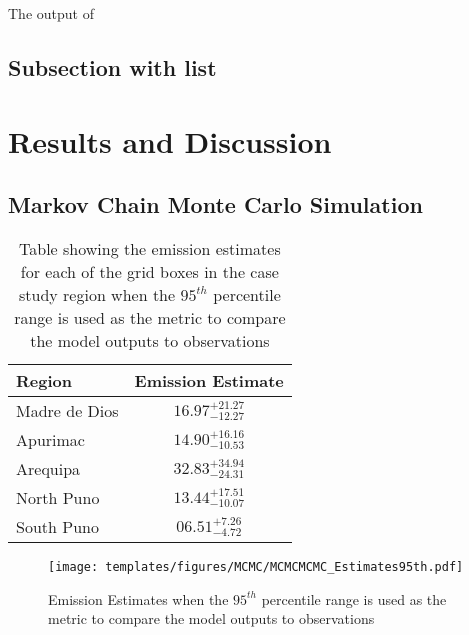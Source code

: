 \begin{flushleft}
The output of 
\end{flushleft}


\subsection{Subsection with list}



\section{Results and Discussion}
\subsection{Markov Chain Monte Carlo Simulation }
\renewcommand{\arraystretch}{2}

    
\begin{table}[H]
\caption{Table showing the emission estimates for each of the grid boxes in the case study region when the $95^{th}$ percentile range is used as the metric to compare the model outputs to observations}
    \label{tab:MCMC_estimates}
\begin{tabular}{lc}

\textbf{Region}        & \textbf{Emission Estimate}                             \\
\hline
Madre de Dios & $16.97^{+21.27}_{-12.27}$ \\

Apurimac      & $14.90^{+16.16}_{-10.53}$\\

Arequipa      & $32.83^{+34.94}_{-24.31}$ \\

North Puno    & $13.44^{+17.51}_{-10.07}$ \\

South Puno    & $06.51^{+7.26}_{-4.72}$ \\
\hline
\end{tabular}
\centering
\end{table}

\begin{figure}[H]
  \texttt{[image: templates/figures/MCMC/MCMCMCMC\_Estimates95th.pdf]}
  \centering
  \caption{Emission Estimates when the $95^{th}$ percentile range is used as the metric to compare the model outputs to observations }
  \label{fig:MCMC_estimatesiqr}
\end{figure}
\FloatBarrier

